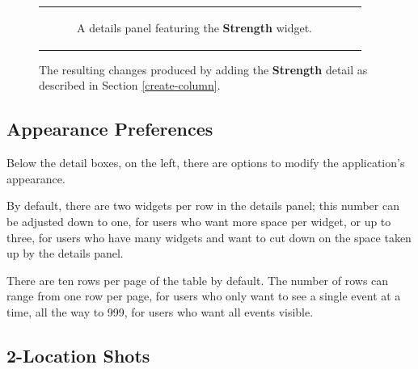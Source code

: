\documentclass[letterpaper]{article}
\begin{document}
\begin{figure}[t]
\begin{tabular}[b]{cc}
\begin{subfigure}{.3\textwidth}
			\caption{A details panel featuring the \textbf{Strength} widget.}
		\end{subfigure}
	\end{tabular}
	\caption{The resulting changes produced by adding the \textbf{Strength} detail as described in Section \ref{create-column}.}
		\label{fig:strength-changes}
\end{figure}

\subsection{Appearance Preferences} \label{modify-appearance}
Below the detail boxes, on the left, there are options to modify the application's appearance.

By default, there are two widgets per row in the details panel; this number can be adjusted down to one, for users who want more space per widget, or up to three, for users who have many widgets and want to cut down on the space taken up by the details panel.

There are ten rows per page of the table by default. The number of rows can range from one row per page, for users who only want to see a single event at a time, all the way to 999, for users who want all events visible.
\subsection{2-Location Shots} \label{two-location}
\end{document}
